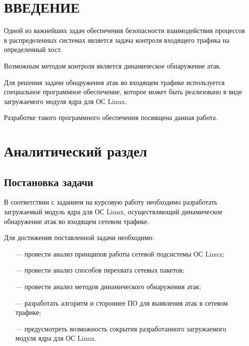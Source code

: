 \documentclass{bmstu}
\begin{document}



\maketableofcontents

\chapter*{ВВЕДЕНИЕ}

Одной из важнейших задач обеспечения безопасности взаимодействия процессов в распределенных системах является задача контроля входящего трафика на определенный хост.

Возможным методом контроля является динамическое обнаружение атак. 

Для решения задачи обнаружения атак во входящем трафике используется специальное программное обеспечение, которое может быть реализовано в виде загружаемого модуля ядра для ОС Linux.

Разработке такого программного обеспечения посвящена данная работа.


\chapter{Аналитический раздел}
\section{Постановка задачи}
В соответствии с заданием на курсовую работу необходимо разработать загружаемый модуль ядра для ОС Linux, осуществляющий динамическое обнаружение атак во входящем сетевом трафике. 



Для достижения поставленной задачи необходимо:
\begin{itemize}
	\item[---] провести анализ принципов работы сетевой подсистемы ОС Linux;
	\item[---] провести анализ способов перехвата сетевых пакетов;
        \item[---] провести анализ методов динамического обнаружения атак;
	\item[---] разработать алгоритм и стороннее ПО для выявления атак в сетевом трафике;
	\item[---] предусмотреть возможность сокрытия разработанного загружаемого модуля ядра для ОС Linux.
\end{itemize}
\end{document}
